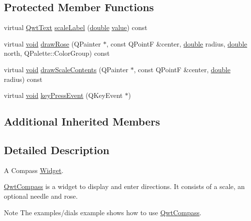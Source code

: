 \subsection*{Protected Member Functions}
\begin{DoxyCompactItemize}
\item 
virtual \hyperlink{class_qwt_text}{Qwt\-Text} \hyperlink{class_qwt_compass_a091c7ac5792d87e20bfc7efce9eeeb16}{scale\-Label} (\hyperlink{_super_l_u_support_8h_a8956b2b9f49bf918deed98379d159ca7}{double} \hyperlink{glext_8h_aa0e2e9cea7f208d28acda0480144beb0}{value}) const 
\item 
virtual \hyperlink{group___u_a_v_objects_plugin_ga444cf2ff3f0ecbe028adce838d373f5c}{void} \hyperlink{class_qwt_compass_a3cc1a7d06b9d6be235024a19ff0c6a25}{draw\-Rose} (Q\-Painter $\ast$, const Q\-Point\-F \&center, \hyperlink{_super_l_u_support_8h_a8956b2b9f49bf918deed98379d159ca7}{double} radius, \hyperlink{_super_l_u_support_8h_a8956b2b9f49bf918deed98379d159ca7}{double} north, Q\-Palette\-::\-Color\-Group) const 
\item 
virtual \hyperlink{group___u_a_v_objects_plugin_ga444cf2ff3f0ecbe028adce838d373f5c}{void} \hyperlink{class_qwt_compass_a562e9358a830106f9d219a4fa8af3540}{draw\-Scale\-Contents} (Q\-Painter $\ast$, const Q\-Point\-F \&center, \hyperlink{_super_l_u_support_8h_a8956b2b9f49bf918deed98379d159ca7}{double} radius) const 
\item 
virtual \hyperlink{group___u_a_v_objects_plugin_ga444cf2ff3f0ecbe028adce838d373f5c}{void} \hyperlink{class_qwt_compass_ad4f31e6837ea045834fe67d192a4209d}{key\-Press\-Event} (Q\-Key\-Event $\ast$)
\end{DoxyCompactItemize}
\subsection*{Additional Inherited Members}


\subsection{Detailed Description}
A Compass \hyperlink{class_widget}{Widget}. 

\hyperlink{class_qwt_compass}{Qwt\-Compass} is a widget to display and enter directions. It consists of a scale, an optional needle and rose.



\begin{DoxyNote}{Note}
The examples/dials example shows how to use \hyperlink{class_qwt_compass}{Qwt\-Compass}. 
\end{DoxyNote}


